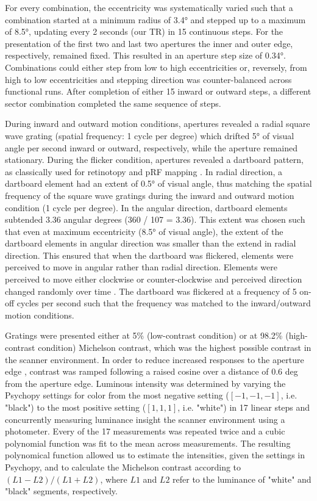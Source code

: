 For every combination, the eccentricity was systematically varied such that a combination started at a minimum radius of 3.4° and stepped up to a maximum of 8.5°, updating every 2 seconds (our TR) in 15 continuous steps. For the presentation of the first two and last two apertures the inner and outer edge, respectively, remained fixed. This resulted in an aperture step size of 0.34°. Combinations could either step from low to high eccentricities or, reversely, from high to low eccentricities and stepping direction was counter-balanced across functional runs. After completion of either 15 inward or outward steps, a different sector combination completed the same sequence of steps.

During inward and outward motion conditions, apertures revealed a radial square wave grating (spatial frequency: 1 cycle per degree) which drifted 5° of visual angle per second inward or outward, respectively, while the aperture remained stationary. During the flicker condition, apertures revealed a dartboard pattern, as classically used for retinotopy and pRF mapping \parencite{Dumoulin2008}. In radial direction, a dartboard element had an extent of 0.5° of visual angle, thus matching the spatial frequency of the square wave gratings during the inward and outward motion condition (1 cycle per degree). In the angular direction, dartboard elements subtended 3.36 angular degrees (360 / 107 = 3.36). This extent was chosen such that even at maximum eccentricity (8.5° of visual angle), the extent of the dartboard elements in angular direction was smaller than the extend in radial direction. This ensured that when the dartboard was flickered, elements were perceived to move in angular rather than radial direction. Elements were perceived to move either clockwise or counter-clockwise and perceived direction changed randomly over time \parencite{Amano2009}. The dartboard was flickered at a frequency of 5 on-off cycles per second such that the frequency was matched to the inward/outward motion conditions.

Gratings were presented either at 5\% (low-contrast condition) or at 98.2\% (high-contrast condition) Michelson contrast, which was the highest possible contrast in the scanner environment. In order to reduce increased responses to the aperture edge \parencite{Wang2014, Schellekens2016}, contrast was ramped following a raised cosine over a distance of 0.6 deg from the aperture edge. Luminous intensity was determined by varying the Psychopy settings for color from the most negative setting ($[-1, -1, -1]$, i.e. "black") to the most positive setting ($[1, 1, 1]$, i.e. "white") in 17 linear steps and concurrently measuring luminance insight the scanner environment using a photometer. Every of the 17 measurements was repeated twice and a cubic polynomial function was fit to the mean across measurements. The resulting polynomical function allowed us to estimate the intensities, given the settings in Psychopy, and to calculate the Michelson contrast according to $(L1-L2) / (L1+L2)$, where $L1$ and $L2$ refer to the luminance of "white" and "black" segments, respectively.

